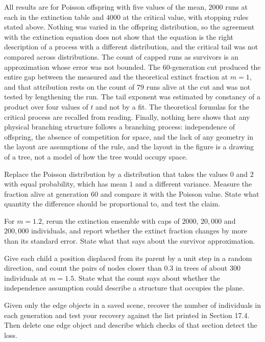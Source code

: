 All results are for Poisson offspring with five values of the mean, $2000$ runs at each in the extinction table and $4000$ at the critical value, with stopping rules stated above. Nothing was varied in the offspring distribution, so the agreement with the extinction equation does not show that the equation is the right description of a process with a different distribution, and the critical tail was not compared across distributions. The count of capped runs as survivors is an approximation whose error was not bounded. The $60$-generation cut produced the entire gap between the measured and the theoretical extinct fraction at $m=1$, and that attribution rests on the count of $79$ runs alive at the cut and was not tested by lengthening the run. The tail exponent was estimated by constancy of a product over four values of $t$ and not by a fit. The theoretical formulas for the critical process are recalled from reading. Finally, nothing here shows that any physical branching structure follows a branching process: independence of offspring, the absence of competition for space, and the lack of any geometry in the layout are assumptions of the rule, and the layout in the figure is a drawing of a tree, not a model of how the tree would occupy space.

\begin{exercise}
Replace the Poisson distribution by a distribution that takes the values $0$ and $2$ with equal probability, which has mean $1$ and a different variance. Measure the fraction alive at generation $60$ and compare it with the Poisson value. State what quantity the difference should be proportional to, and test the claim.
\end{exercise}

\begin{exercise}
For $m=1.2$, rerun the extinction ensemble with caps of $2000$, $20{,}000$ and $200{,}000$ individuals, and report whether the extinct fraction changes by more than its standard error. State what that says about the survivor approximation.
\end{exercise}

\begin{exercise}
Give each child a position displaced from its parent by a unit step in a random direction, and count the pairs of nodes closer than $0.3$ in trees of about $300$ individuals at $m=1.5$. State what the count says about whether the independence assumption could describe a structure that occupies the plane.
\end{exercise}

\begin{exercise}
Given only the edge objects in a saved scene, recover the number of individuals in each generation and test your recovery against the list printed in Section 17.4. Then delete one edge object and describe which checks of that section detect the loss.
\end{exercise}
